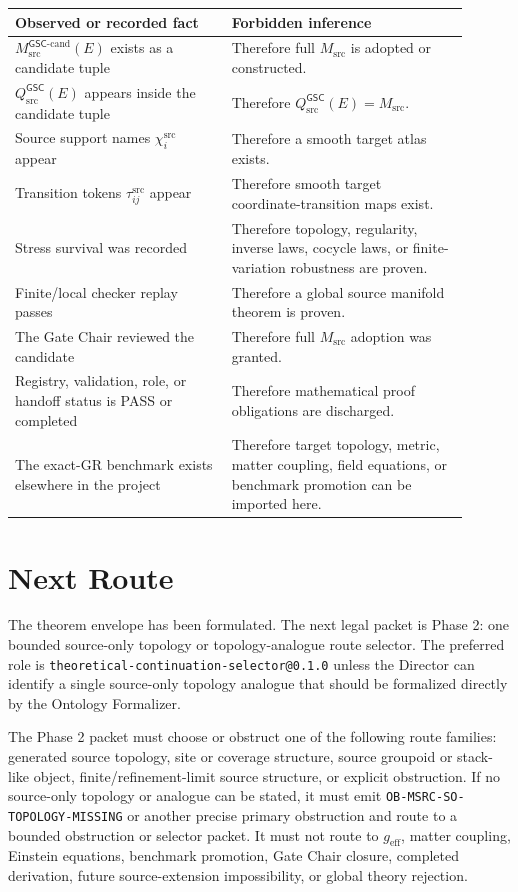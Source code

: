 \documentclass[11pt]{article}
\newcommand{\GSC}{\mathsf{GSC}}
\newcommand{\Msrc}{M_{\mathrm{src}}}
\newcommand{\Mgsccand}{M_{\mathrm{src}}^{\GSC\mbox{-}\mathrm{cand}}}
\newcommand{\Qsrc}{Q_{\mathrm{src}}^{\GSC}}
\newcommand{\geff}{g_{\mathrm{eff}}}
\begin{document}
\begin{longtable}{|p{0.43\linewidth}|p{0.47\linewidth}|}
\hline
\textbf{Observed or recorded fact} & \textbf{Forbidden inference} \\
\hline
\(\Mgsccand(E)\) exists as a candidate tuple & Therefore full \(\Msrc\) is adopted or constructed. \\
\hline
\(\Qsrc(E)\) appears inside the candidate tuple & Therefore \(\Qsrc(E)=\Msrc\). \\
\hline
Source support names \(\chi_i^{\mathrm{src}}\) appear & Therefore a smooth target atlas exists. \\
\hline
Transition tokens \(\tau_{ij}^{\mathrm{src}}\) appear & Therefore smooth target coordinate-transition maps exist. \\
\hline
Stress survival was recorded & Therefore topology, regularity, inverse laws, cocycle laws, or finite-variation robustness are proven. \\
\hline
Finite/local checker replay passes & Therefore a global source manifold theorem is proven. \\
\hline
The Gate Chair reviewed the candidate & Therefore full \(\Msrc\) adoption was granted. \\
\hline
Registry, validation, role, or handoff status is PASS or completed & Therefore mathematical proof obligations are discharged. \\
\hline
The exact-GR benchmark exists elsewhere in the project & Therefore target topology, metric, matter coupling, field equations, or benchmark promotion can be imported here. \\
\hline
\end{longtable}

\section{Next Route}

The theorem envelope has been formulated. The next legal packet is Phase 2:
one bounded source-only topology or topology-analogue route selector. The
preferred role is \texttt{theoretical-continuation-selector@0.1.0} unless the
Director can identify a single source-only topology analogue that should be
formalized directly by the Ontology Formalizer.

The Phase 2 packet must choose or obstruct one of the following route families:
generated source topology, site or coverage structure, source groupoid or
stack-like object, finite/refinement-limit source structure, or explicit
obstruction. If no source-only topology or analogue can be stated, it must
emit \texttt{OB-MSRC-SO-TOPOLOGY-MISSING} or another precise primary
obstruction and route to a bounded obstruction or selector packet. It must not
route to \(\geff\), matter coupling, Einstein equations, benchmark promotion,
Gate Chair closure, completed derivation, future source-extension
impossibility, or global theory rejection.
\end{document}
